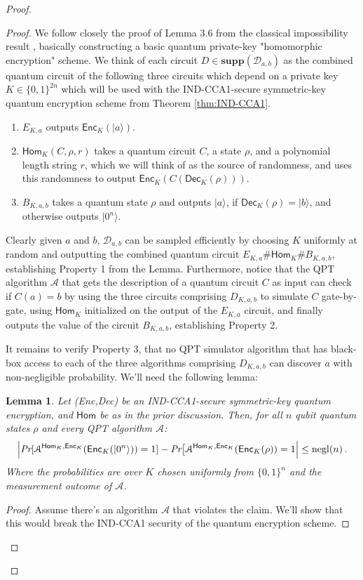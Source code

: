 \documentclass[11pt]{article}
\numberwithin{equation}{section}
\newtheorem{lemma}[theorem]{Lemma}
\newcommand{\opn}{\operatorname}
\newcommand{\algo}{\mathcal}
\newcommand{\negl}{\opn{negl}}
\newcommand{\Enc}{\ensuremath{\mathsf{Enc}}\xspace}
\newcommand{\Dec}{\ensuremath{\mathsf{Dec}}\xspace}
\newcommand{\Homorcl}{\ensuremath{\mathsf{Hom}}\xspace}
\newcommand\supp{\textbf{supp}}
\begin{document}
{\begin{proof}
\begin{proof}  We follow closely the proof of Lemma 3.6 from the classical impossibility result \cite{BGIRSVY12}, basically constructing a basic quantum private-key "homomorphic encryption" scheme.  We think of each circuit $D\in \supp(\mathcal{D}_{a,b})$ as the combined quantum circuit of the following three circuits which depend on a private key $K\in\{0,1\}^{2n}$ which will be used with the IND-CCA1-secure symmetric-key quantum encryption scheme from Theorem \ref{thm:IND-CCA1}.
\begin{enumerate}
\item{$E_{K,a}$ outputs  $\Enc_{K}(|a\rangle)$}.  
\item{$\Homorcl_K(C,\rho,r)$ takes a quantum circuit $C$, a state $\rho$, and a polynomial length string $r$, which we will think of as the source of randomness, and uses this randomness to output $\Enc_K(C(\Dec_K(\rho)))$}.
\item{$B_{K,a,b}$ takes a quantum state $\rho$ and outputs $|a\rangle$, if $\Dec_{K}(\rho)=|b\rangle$, and otherwise outputs $|0^n\rangle$.}	
\end{enumerate}

Clearly given $a$ and $b$, $\mathcal{D}_{a,b}$ can be sampled efficiently by choosing $K$ uniformly at random and outputting the combined quantum circuit $E_{K,a}\#\Homorcl_{K}\#B_{K,a,b}$, establishing Property 1 from the Lemma.  Furthermore, notice that the QPT algorithm $\algo{A}$ that gets the description of a quantum circuit $C$ as input can check if $C(a)=b$ by using the three circuits comprising $D_{K,a,b}$ to simulate $C$ gate-by-gate, using $\Homorcl_K$ initialized on the output of the $E_{K,a}$ circuit, and finally outputs the value of the circuit $B_{K,a,b}$, establishing Property 2.  

It remains to verify Property 3, that no QPT simulator algorithm that has black-box access to  each of the three algorithms comprising $D_{K,a,b}$ can discover $a$ with non-negligible probability.  We'll need the following lemma:
\begin{lemma}\label{hybrid-lemma}
Let (Enc,Dec) be an IND-CCA1-secure symmetric-key quantum encryption, and $\Homorcl$ be as in the prior discussion.  Then, for all $n$ qubit quantum states $\rho$ and every QPT algorithm $\algo{A}$:
$$
\Bigl| \emph{Pr}[\mathcal A^{\Homorcl_K,\Enc_K}(\Enc_K(|0^n\rangle)) = 1] - \emph{Pr}\bigl[\mathcal A^{\Homorcl_K,\Enc_K}(\Enc_K(\rho)) = 1 \Bigr| \leq \negl(n)\,.
$$
Where the probabilities are over $K$ chosen uniformly from $\{0,1\}^n$ and the measurement outcome of $\algo{A}$.
\end{lemma}
\begin{proof}
Assume there's an algorithm $\algo{A}$ that violates the claim.  We'll show that this would break the IND-CCA1 security of the quantum encryption scheme.


\end{proof}
\end{proof}
\end{proof}}
\end{document}
